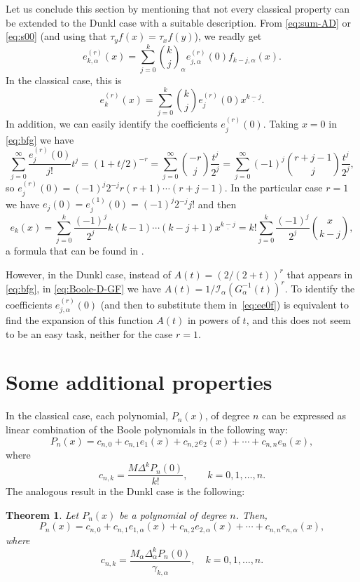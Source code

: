 \documentclass[11pt]{article}
\theoremstyle{plain}
\newtheorem{theorem}{Theorem}[section]
\theoremstyle{remark}
\numberwithin{equation}{section} %
\newcommand{\binoma}[2]{\binom{#1}{#2}_{\!\alpha}}
\newcommand{\I}{\mathcal{I}}
\begin{document}
Let us conclude this section by mentioning that not every classical property can be extended to the Dunkl case with a suitable description. From \eqref{eq:sum-AD} or \eqref{eq:s00} (and using that $\tau_y f(x) = \tau_x f(y)$), we readly get
\begin{equation}
\label{eq:ee0f}
  e_{k,\alpha}^{(r)}(x) = \sum_{j=0}^k \binoma{k}{j} e_{j,\alpha}^{(r)}(0) f_{k-j,\alpha}(x).
\end{equation}
In the classical case, this is 
\[
  e_{k}^{(r)}(x) = \sum_{j=0}^k \binom{k}{j} e_{j}^{(r)}(0) x^{\underline{k-j}}.
\]
In addition, we can easily identify the coefficients $e_{j}^{(r)}(0)$. Taking $x=0$ in \eqref{eq:bfg} we have
\[
  \sum_{j=0}^{\infty} \frac{e^{(r)}_j(0)}{j!}t^j = \left(1+t/2\right)^{-r} 
  = \sum_{j=0}^{\infty} \binom{-r}{j} \frac{t^j}{2^j}
  = \sum_{j=0}^{\infty} (-1)^j \binom{r+j-1}{j} \frac{t^j}{2^j},
\]
so $e^{(r)}_j(0) = (-1)^j 2^{-j} r (r+1) \cdots (r+j-1)$. In the particular case $r=1$ we have $e_j(0) = e^{(1)}_j(0) = (-1)^j 2^{-j} j!$ and then
\[
  e_{k}(x) = \sum_{j=0}^k \frac{(-1)^j}{2^j} k (k-1) \cdots (k-j+1) x^{\underline{k-j}}
  = k! \sum_{j=0}^k \frac{(-1)^j}{2^j} \binom{x}{k-j},
\]
a formula that can be found in \cite[\S\,113, (4), p.~318]{Jor2}.

However, in the Dunkl case, instead of $A(t) = (2/(2+t))^r$ that appears in \eqref{eq:bfg}, in \eqref{eq:Boole-D-GF} we have $A(t) = 1/\I_{\alpha}(G_{\alpha}^{-1}(t))^r$. To identify the coefficients $e_{j,\alpha}^{(r)}(0)$ (and then to substitute them in~\eqref{eq:ee0f}) is equivalent to find the expansion of this function $A(t)$ in powers of $t$, and this does not seem to be an easy task, neither for the case $r=1$.

\section{Some additional properties}
\label{sec:additional}

In the classical case, each polynomial, $P_n(x)$, of degree $n$ can be expressed as linear combination of the Boole polynomials in the following way:
\[
  P_n(x) = c_{n,0} + c_{n,1}e_1(x) + c_{n,2}e_2(x) + \cdots + c_{n,n}e_n(x),
\]
where
\[
  c_{n,k} = \frac{M\Delta^k P_n(0)}{k!},
  \qquad k=0,1,\ldots,n.
\]
The analogous result in the Dunkl case is the following:

\begin{theorem}
Let $P_n(x)$ be a polynomial of degree $n$. Then, 
\[
  P_n(x) = c_{n,0} + c_{n,1}e_{1,\alpha}(x) + c_{n,2}e_{2,\alpha}(x) + \cdots + c_{n,n}e_{n,\alpha}(x),
\]
where
\[
  c_{n,k} = \frac{M_{\alpha}\Delta_{\alpha}^k P_n(0)}{\gamma_{k,\alpha}},\quad k=0, 1,\ldots, n.
\]
\end{theorem}
\end{document}
